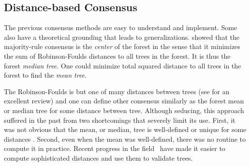 \subsection{Distance-based Consensus} \label{sec:distance-based-consensus-tree}

The previous consensus methods are easy to understand and implement. Some also have a theoretical grounding that leads to generalizations. \citet{Barthelemy1986} showed that the majority-rule consensus is the \emph{center} of the forest in the sense that it minimizes the sum of Robinson-Foulds distances \citep{Robinson1979} to all trees in the forest. It is thus the forest \emph{median tree}. One could minimize total squared distance to all trees in the forest to find the \emph{mean tree}.

The Robinson-Foulds is but one of many distances between trees (see \citet{St.John2017} for an excellent review) and one can define other consensus similarly as the forest mean or median tree for some distance between tree. Although seducing, this approach suffered in the past from two shortcomings that severely limit its use. First, it was not obvious that the mean, or median, tree is well-defined or unique for some distances \citep{Billera2001}. Second, even when the mean was well-defined, there was no routine to compute it in practice. Recent progress in the field~\citep{Miller2015} have made it easier to compute sophisticated distances and use them to validate trees. %
